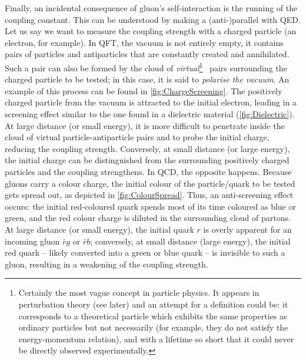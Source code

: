Finally, an incidental consequence of gluon's self-interaction is the running of the coupling constant. This can be understood by making a (anti-)parallel with QED. Let us say we want to measure the coupling strength with a charged particle (an electron, for example). In QFT, the vacuum is not entirely empty, it contains pairs of particles and antiparticles that are constantly created and annihilated. Such a pair can also be formed by the cloud of \textit{virtual}\footnote{Certainly the most vague concept in particle physics. It appears in perturbation theory (see later) and an attempt for a definition could be: it corresponds to a theoretical particle which exhibits the same properties as ordinary particles but not necessarily (for example, they do not satisfy the energy-momentum relation), and with a lifetime so short that it could never be directly observed experimentally.} \EplusEminus\ pairs surrounding the charged particle to be tested; in this case, it is said to \textit{polarise the vacuum}. An example of this process can be found in \fig\ref{fig:ChargeScreening}. The positively charged particle from the vacuum is attracted to the initial electron, leading in a screening effect similar to the one found in a dielectric material (\fig\ref{fig:Dielectric}). At large distance (or small energy), it is more difficult to penetrate inside the cloud of virtual particle-antiparticle pairs and to probe the initial charge, reducing the coupling strength. Conversely, at small distance (or large energy), the initial charge can be distinguished from the surrounding positively charged particles and the coupling strengthens. In QCD, the opposite happens.  Because gluons carry a colour charge, the initial colour of the particle/quark to be tested gets spread out, as depicted in \fig\ref{fig:ColourSpread}. Thus, an anti-screening effect occurs: the initial red-coloured quark spends most of its time coloured as blue or green, and the red colour charge is diluted in the surrounding cloud of partons. At large distance (or small energy), the initial quark $r$ is overly apparent for an incoming gluon $\bar{r}g$ or $\bar{r}b$; conversely, at small distance (large energy), the initial red quark -- likely converted into a green or blue quark -- is invisible to such a gluon, resulting in a weakening of the coupling strength. \\

